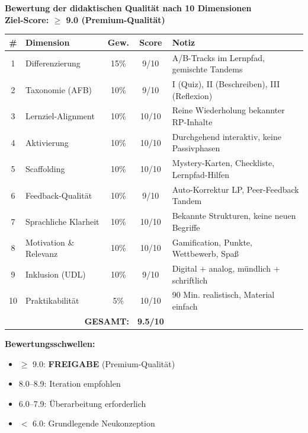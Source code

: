 \documentclass[11pt,a4paper]{article}
\begin{document}
\begin{scorebox}
\textbf{Bewertung der didaktischen Qualität nach 10 Dimensionen}\\
\textbf{Ziel-Score: $\geq$ 9.0 (Premium-Qualität)}

\vspace{1em}
\begin{tabular}{|c|l|c|c|p{4.5cm}|}
\hline
\textbf{\#} & \textbf{Dimension} & \textbf{Gew.} & \textbf{Score} & \textbf{Notiz} \\
\hline
1 & Differenzierung & 15\% & 9/10 & A/B-Tracks im Lernpfad, gemischte Tandems \\
\hline
2 & Taxonomie (AFB) & 10\% & 9/10 & I (Quiz), II (Beschreiben), III (Reflexion) \\
\hline
3 & Lernziel-Alignment & 10\% & 10/10 & Reine Wiederholung bekannter RP-Inhalte \\
\hline
4 & Aktivierung & 10\% & 10/10 & Durchgehend interaktiv, keine Passivphasen \\
\hline
5 & Scaffolding & 10\% & 10/10 & Mystery-Karten, Checkliste, Lernpfad-Hilfen \\
\hline
6 & Feedback-Qualität & 10\% & 9/10 & Auto-Korrektur LP, Peer-Feedback Tandem \\
\hline
7 & Sprachliche Klarheit & 10\% & 10/10 & Bekannte Strukturen, keine neuen Begriffe \\
\hline
8 & Motivation \& Relevanz & 10\% & 10/10 & Gamification, Punkte, Wettbewerb, Spaß \\
\hline
9 & Inklusion (UDL) & 10\% & 9/10 & Digital + analog, mündlich + schriftlich \\
\hline
10 & Praktikabilität & 5\% & 10/10 & 90 Min. realistisch, Material einfach \\
\hline
\multicolumn{3}{|r|}{\textbf{GESAMT:}} & \textbf{9.5/10} & \\
\hline
\end{tabular}

\vspace{1em}
\textbf{Bewertungsschwellen:}
\begin{itemize}
    \item[\checkmark] \textcolor{successgreen}{$\geq$ 9.0: \textbf{FREIGABE} (Premium-Qualität)}
    \item[$\Box$] \textcolor{warningorange}{8.0--8.9: Iteration empfohlen}
    \item[$\Box$] 6.0--7.9: Überarbeitung erforderlich
    \item[$\Box$] $<$ 6.0: Grundlegende Neukonzeption
\end{itemize}


\end{scorebox}
\end{document}
